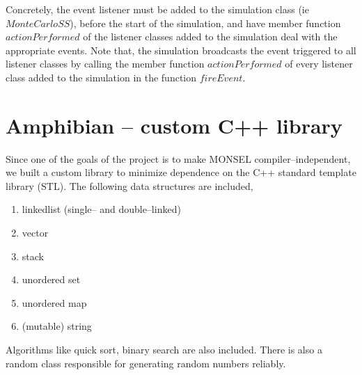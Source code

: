 Concretely, the event listener must be added to the simulation class (ie $MonteCarloSS$), before the start of the simulation, and have member function $actionPerformed$ of the listener classes added to the simulation deal with the appropriate events. Note that, the simulation broadcasts the event triggered to all listener classes by calling the member function $actionPerformed$ of every listener class added to the simulation in the function $fireEvent$.

\section{Amphibian -- custom C++ library}
Since one of the goals of the project is to make MONSEL compiler--independent, we built a custom library to minimize dependence on the C++ standard template library (STL). The following data structures are included,
\begin{enumerate}
\item linkedlist (single-- and double--linked)
\item vector
\item stack
\item unordered set
\item unordered map
\item (mutable) string
\end{enumerate}

Algorithms like quick sort, binary search are also included. There is also a random class responsible for generating random numbers reliably.

